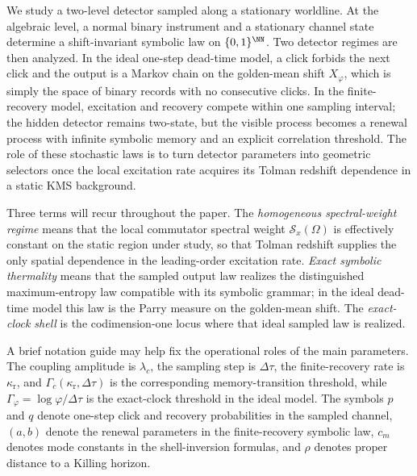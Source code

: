 We study a two-level detector sampled along a stationary worldline. At the algebraic level, a normal binary instrument and a stationary channel state determine a shift-invariant symbolic law on $\{0,1\}^{\NN}$. Two detector regimes are then analyzed. In the ideal one-step dead-time model, a click forbids the next click and the output is a Markov chain on the golden-mean shift $X_\varphi$, which is simply the space of binary records with no consecutive clicks. In the finite-recovery model, excitation and recovery compete within one sampling interval; the hidden detector remains two-state, but the visible process becomes a renewal process with infinite symbolic memory and an explicit correlation threshold. The role of these stochastic laws is to turn detector parameters into geometric selectors once the local excitation rate acquires its Tolman redshift dependence in a static KMS background.

Three terms will recur throughout the paper. The \emph{homogeneous spectral-weight regime} means that the local commutator spectral weight $\mathcal S_x(\Omega)$ is effectively constant on the static region under study, so that Tolman redshift supplies the only spatial dependence in the leading-order excitation rate. \emph{Exact symbolic thermality} means that the sampled output law realizes the distinguished maximum-entropy law compatible with its symbolic grammar; in the ideal dead-time model this law is the Parry measure on the golden-mean shift. The \emph{exact-clock shell} is the codimension-one locus where that ideal sampled law is realized.

A brief notation guide may help fix the operational roles of the main parameters. The coupling amplitude is $\lambda_c$, the sampling step is $\Delta\tau$, the finite-recovery rate is $\kappa_{\mathrm r}$, and $\Gamma_c(\kappa_{\mathrm r},\Delta\tau)$ is the corresponding memory-transition threshold, while $\Gamma_\varphi=\log\varphi/\Delta\tau$ is the exact-clock threshold in the ideal model. The symbols $p$ and $q$ denote one-step click and recovery probabilities in the sampled channel, $(a,b)$ denote the renewal parameters in the finite-recovery symbolic law, $c_m$ denotes mode constants in the shell-inversion formulas, and $\rho$ denotes proper distance to a Killing horizon.

